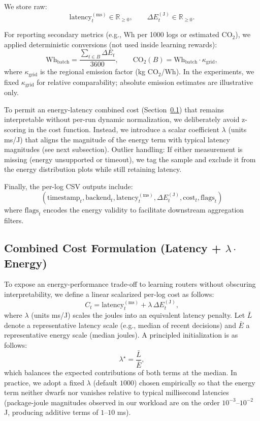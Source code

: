 We store raw:
\[
\text{latency}_t^{(\mathrm{ms})} \in \mathbb{R}_{\ge 0}, \qquad \Delta E_t^{(\mathrm{J})} \in \mathbb{R}_{\ge 0}.
\]

For reporting secondary metrics (e.g., Wh per 1000 logs or estimated $\text{CO}_2$), we applied deterministic conversions (not used inside learning rewards):
\[
\text{Wh}_{\text{batch}} = \frac{\sum_{t \in B} \Delta E_t}{3600}, \qquad
\text{CO}_2(B) = \text{Wh}_{\text{batch}} \cdot \kappa_{\text{grid}},
\]
where $\kappa_{\text{grid}}$ is the regional emission factor (kg $\text{CO}_2$/Wh). In the experiments, we fixed $\kappa_{\text{grid}}$ for relative comparability; absolute emission estimates are illustrative only.

To permit an energy-latency combined cost (Section~\ref{s:combined-cost}) that remains interpretable without per-run dynamic normalization, we deliberately avoid z-scoring in the cost function. Instead, we introduce a scalar coefficient $\lambda$ (units ms/J) that aligns the magnitude of the energy term with typical latency magnitudes (see next subsection). Outlier handling: If either measurement is missing (energy unsupported or timeout), we tag the sample and exclude it from the energy distribution plots while still retaining latency.

Finally, the per-log CSV outputs include:
\[
(\text{timestamp}_t, \text{backend}_t, \text{latency}_t^{(\mathrm{ms})}, \Delta E_t^{(\mathrm{J})}, \text{cost}_t, \text{flags}_t)
\]
where $\text{flags}_t$ encodes the energy validity to facilitate downstream aggregation filters.

\subsection{Combined Cost Formulation (Latency + $\lambda \cdot$ Energy)}
\label{s:combined-cost}
To expose an energy-performance trade-off to learning routers without obscuring interpretability, we define a linear scalarized per-log cost as follows:
\[
C_t = \text{latency}_t^{(\mathrm{ms})} + \lambda \,\Delta E_t^{(\mathrm{J})},
\]
where $\lambda$ (units ms/J) scales the joules into an equivalent latency penalty. Let $\bar{L}$ denote a representative latency scale (e.g., median of recent decisions) and $\bar{E}$ a representative energy scale (median joules). A principled initialization is as follows:
\[
\lambda^\star = \frac{\bar{L}}{\bar{E}},
\]
which balances the expected contributions of both terms at the median. In practice, we adopt a fixed $\lambda$ (default $1000$) chosen empirically so that the energy term neither dwarfs nor vanishes relative to typical millisecond latencies (package-joule magnitudes observed in our workload are on the order $10^{-3}$--$10^{-2}$ J, producing additive terms of $1$--$10$ ms).

